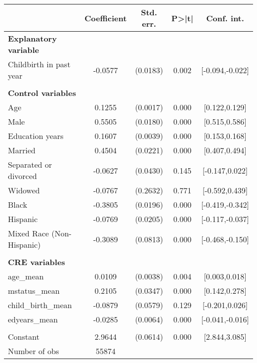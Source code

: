 {
\def\sym#1{\ifmmode^{#1}\else\(^{#1}\)\fi}
\begin{tabular}{l*{1}{cccc}}
\toprule
                    & Coefficient&   Std. err.&       P>|t|&  Conf. int.\\
\midrule
\textbf{Explanatory variable}&            &            &            &            \\
Childbirth in past year&     -0.0577&    (0.0183)&       0.002&[-0.094,-0.022]\\
\\ \textbf{Control variables}&            &            &            &            \\
Age                 &      0.1255&    (0.0017)&       0.000&[0.122,0.129]\\
Male                &      0.5505&    (0.0180)&       0.000&[0.515,0.586]\\
Education years     &      0.1607&    (0.0039)&       0.000&[0.153,0.168]\\
Married             &      0.4504&    (0.0221)&       0.000&[0.407,0.494]\\
Separated or divorced&     -0.0627&    (0.0430)&       0.145&[-0.147,0.022]\\
Widowed             &     -0.0767&    (0.2632)&       0.771&[-0.592,0.439]\\
Black               &     -0.3805&    (0.0196)&       0.000&[-0.419,-0.342]\\
Hispanic            &     -0.0769&    (0.0205)&       0.000&[-0.117,-0.037]\\
Mixed Race (Non-Hispanic)&     -0.3089&    (0.0813)&       0.000&[-0.468,-0.150]\\
\\ \textbf{CRE variables}&            &            &            &            \\
age\_mean            &      0.0109&    (0.0038)&       0.004&[0.003,0.018]\\
mstatus\_mean        &      0.2105&    (0.0347)&       0.000&[0.142,0.278]\\
child\_birth\_mean    &     -0.0879&    (0.0579)&       0.129&[-0.201,0.026]\\
edyears\_mean        &     -0.0285&    (0.0064)&       0.000&[-0.041,-0.016]\\
                    &            &            &            &            \\
Constant            &      2.9644&    (0.0614)&       0.000&[2.844,3.085]\\
\midrule
Number of obs       &       55874&            &            &            \\

\end{tabular}}

